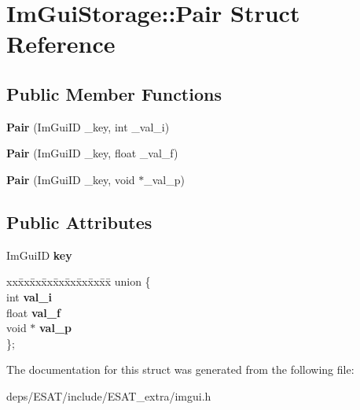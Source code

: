 \hypertarget{struct_im_gui_storage_1_1_pair}{}\section{Im\+Gui\+Storage\+:\+:Pair Struct Reference}
\label{struct_im_gui_storage_1_1_pair}
\subsection*{Public Member Functions}
\begin{DoxyCompactItemize}
\item 
\mbox{\label{struct_im_gui_storage_1_1_pair_a37542a22048f0af35e5a6beda6900a0e}} 
{\bfseries Pair} (Im\+Gui\+ID \+\_\+key, int \+\_\+val\+\_\+i)
\item 
\mbox{\label{struct_im_gui_storage_1_1_pair_a6f63f598513f2a7a57f2e9ea3b0137b9}} 
{\bfseries Pair} (Im\+Gui\+ID \+\_\+key, float \+\_\+val\+\_\+f)
\item 
\mbox{\label{struct_im_gui_storage_1_1_pair_a4d07d60f83b4e24ee8be9ccceaab76bd}} 
{\bfseries Pair} (Im\+Gui\+ID \+\_\+key, void $\ast$\+\_\+val\+\_\+p)
\end{DoxyCompactItemize}
\subsection*{Public Attributes}
\begin{DoxyCompactItemize}
\item 
\mbox{\label{struct_im_gui_storage_1_1_pair_a5b37b692d2eacc7f4f5b6f233359e6ce}} 
Im\+Gui\+ID {\bfseries key}
\item 
\mbox{\label{struct_im_gui_storage_1_1_pair_acb7e084ac6a610d3b721737494cf776d}} 
\begin{tabbing}
xx\=xx\=xx\=xx\=xx\=xx\=xx\=xx\=xx\=\kill
union \{\\
\>int {\bfseries val\_i}\\
\>float {\bfseries val\_f}\\
\>void $\ast$ {\bfseries val\_p}\\
\}; \\

\end{tabbing}\end{DoxyCompactItemize}


The documentation for this struct was generated from the following file\+:\begin{DoxyCompactItemize}
\item 
deps/\+E\+S\+A\+T/include/\+E\+S\+A\+T\+\_\+extra/imgui.\+h\end{DoxyCompactItemize}
